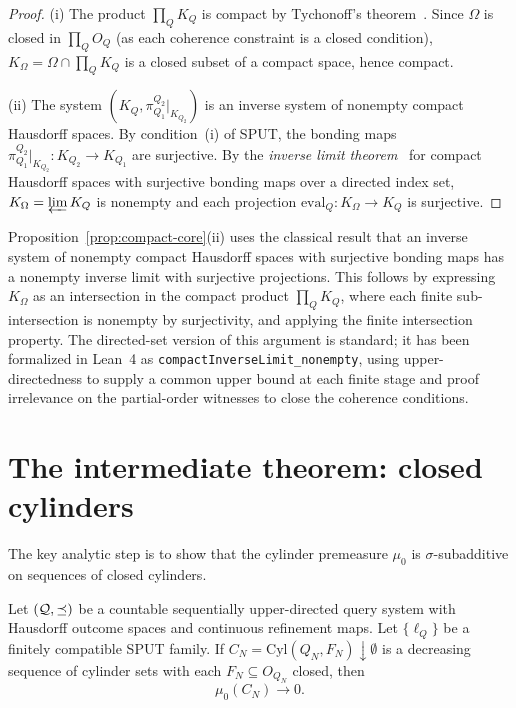 \begin{proof}
(i) The product $\prod_Q K_Q$ is compact by Tychonoff's theorem~\cite{Bourbaki1966}.
Since $\Omega$ is closed in $\prod_Q O_Q$ (as each coherence
constraint is a closed condition), $K_\Omega = \Omega \cap \prod_Q
K_Q$ is a closed subset of a compact space, hence compact.

(ii) The system $(K_Q, \pi^{Q_2}_{Q_1}|_{K_{Q_2}})$ is an inverse
system of nonempty compact Hausdorff spaces.  By condition~(i) of
SPUT, the bonding maps $\pi^{Q_2}_{Q_1}|_{K_{Q_2}} : K_{Q_2} \to
K_{Q_1}$ are surjective.  By the \emph{inverse limit theorem}~\cite{Bourbaki1966,Fremlin2003} for
compact Hausdorff spaces with surjective bonding maps over a directed
index set, $K_\Omega = \varprojlim K_Q$ is nonempty and each
projection $\mathrm{eval}_Q : K_\Omega \to K_Q$ is surjective.
\end{proof}

\begin{remark}
Proposition~\ref{prop:compact-core}(ii) uses the classical result
that an inverse system of nonempty compact Hausdorff spaces with
surjective bonding maps has a nonempty inverse limit with surjective
projections.  This follows by expressing $K_\Omega$ as an
intersection in the compact product $\prod_Q K_Q$, where each finite
sub-intersection is nonempty by surjectivity, and applying the
finite intersection property.  The directed-set version of this
argument is standard; it has been formalized in Lean~4 as
\texttt{compactInverseLimit\_nonempty}, using upper-directedness to
supply a common upper bound at each finite stage and proof irrelevance
on the partial-order witnesses to close the coherence conditions.
\end{remark}

\section[Closed cylinders]{The intermediate theorem: closed cylinders}\label{sec:closed}

The key analytic step is to show that the cylinder premeasure
$\mu_0$ is $\sigma$-subadditive on sequences of closed cylinders.

\begin{theorem}
\label{thm:closed-cylinders}
Let $(\mathcal{Q}, \preceq)$ be a countable sequentially upper-directed
query system with Hausdorff outcome spaces and continuous refinement
maps.  Let $\{\ell_Q\}$ be a finitely compatible SPUT family.  If
$C_N = \mathrm{Cyl}(Q_N, F_N) \downarrow \emptyset$ is a decreasing
sequence of cylinder sets with each $F_N \subseteq O_{Q_N}$ closed,
then
\[
\mu_0(C_N) \to 0.
\]
\end{theorem}


